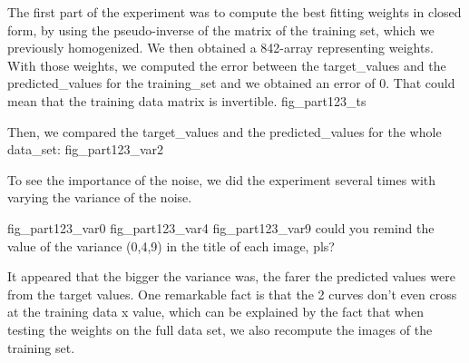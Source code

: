 The first part of the experiment was to compute the best fitting weights in closed form, by using the pseudo-inverse of the matrix of the training set, which we previously homogenized. We then obtained a 842-array representing weights. With those weights, we computed the error between the target_values and the predicted_values for the training_set and we obtained an error of 0. That could mean that the training data matrix is invertible.
          fig_part123_ts

Then, we compared the target_values and the predicted_values for the whole data_set:
            fig_part123_var2

To see the importance of the noise, we did the experiment several times with varying the variance of the noise.
          
          fig_part123_var0  
          fig_part123_var4
          fig_part123_var9          could you remind the value of the variance (0,4,9) in the title of each image, pls? 

It appeared that the bigger the variance was, the farer the predicted values were from the target values. One remarkable fact is that the 2 curves don't even cross at the training data x value, which can be explained by the fact that when testing the weights on the full data set, we also recompute the images of the training set.




